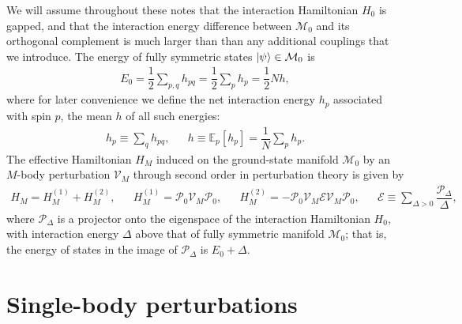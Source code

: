 \documentclass[nofootinbib,notitlepage,11pt]{revtex4-2}
\newcommand{\f}[2]{\dfrac{#1}{#2}} %
\renewcommand{\sp}[1]{\left[#1\right]} %
\newcommand{\1}{\mathds{1}}
\newcommand{\E}{\mathcal{E}}
\newcommand{\M}{\mathcal{M}}
\renewcommand{\P}{\mathcal{P}}
\newcommand{\V}{\mathcal{V}}
\newcommand{\EE}{\mathbb{E}}
\begin{document}
We will assume throughout these notes that the interaction Hamiltonian
$H_0$ is gapped, and that the interaction energy difference between
$\M_0$ and its orthogonal complement is much larger than than any
additional couplings that we introduce.  The energy of fully symmetric
states $\ket\psi\in\M_0$ is
\begin{align}
  E_0 = \f12 \sum_{p,q} h_{pq}
  = \f12 \sum_p h_p
  = \f12 N h,
\end{align}
where for later convenience we define the net interaction energy $h_p$
associated with spin $p$, the mean $h$ of all such energies:
\begin{align}
  h_p \equiv \sum_q h_{pq},
  &&
  h \equiv \EE_p\sp{h_p} = \f1N \sum_p h_p.
\end{align}
The effective Hamiltonian $H_M$ induced on the ground-state manifold
$\M_0$ by an $M$-body perturbation $\V_M$ through second order in
perturbation theory is given by\cite{bravyi2011schrieffer,
  perlin2019effective}
\begin{align}
  H_M = H_M^{(1)} + H_M^{(2)},
  &&
  H_M^{(1)} = \P_0 \V_M \P_0,
  &&
  H_M^{(2)} = - \P_0 \V_M \E \V_M \P_0,
  &&
  \E \equiv \sum_{\Delta>0} \f{\P_\Delta}{\Delta},
\end{align}
where $\P_\Delta$ is a projector onto the eigenspace of the
interaction Hamiltonian $H_0$, with interaction energy $\Delta$ above
that of fully symmetric manifold $\M_0$; that is, the energy of states
in the image of $\P_\Delta$ is $E_0+\Delta$.

\section{Single-body perturbations}
\end{document}
